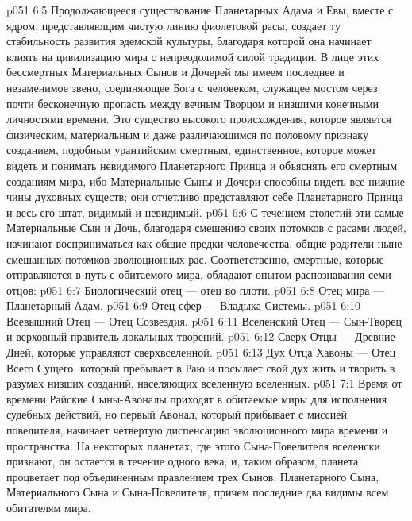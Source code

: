 \vs p051 6:5 \pc Продолжающееся существование Планетарных Адама и Евы, вместе с ядром, представляющим чистую линию фиолетовой расы, создает ту стабильность развития эдемской культуры, благодаря которой она начинает влиять на цивилизацию мира с непреодолимой силой традиции. В лице этих бессмертных Материальных Сынов и Дочерей мы имеем последнее и незаменимое звено, соединяющее Бога с человеком, служащее мостом через почти бесконечную пропасть между вечным Творцом и низшими конечными личностями времени. Это существо высокого происхождения, которое является физическим, материальным и даже различающимся по половому признаку созданием, подобным урантийским смертным, единственное, которое может видеть и понимать невидимого Планетарного Принца и объяснять его смертным созданиям мира, ибо Материальные Сыны и Дочери способны видеть все нижние чины духовных существ; они отчетливо представляют себе Планетарного Принца и весь его штат, видимый и невидимый.
\vs p051 6:6 С течением столетий эти самые Материальные Сын и Дочь, благодаря смешению своих потомков с расами людей, начинают восприниматься как общие предки человечества, общие родители ныне смешанных потомков эволюционных рас. Соответственно, смертные, которые отправляются в путь с обитаемого мира, обладают опытом распознавания семи отцов:
\vs p051 6:7 \bibnobreakspace Биологический отец --- отец во плоти.
\vs p051 6:8 \bibnobreakspace Отец мира --- Планетарный Адам.
\vs p051 6:9 \bibnobreakspace Отец сфер --- Владыка Системы.
\vs p051 6:10 \bibnobreakspace Всевышний Отец --- Отец Созвездия.
\vs p051 6:11 \bibnobreakspace Вселенский Отец --- Сын\hyp{}Творец и верховный правитель локальных творений.
\vs p051 6:12 \bibnobreakspace Сверх Отцы --- Древние Дней, которые управляют сверхвселенной.
\vs p051 6:13 \bibnobreakspace Дух Отца Хавоны --- Отец Всего Сущего, который пребывает в Раю и посылает свой дух жить и творить в разумах низших созданий, населяющих вселенную вселенных.
\vs p051 7:1 Время от времени Райские Сыны\hyp{}Авоналы приходят в обитаемые миры для исполнения судебных действий, но первый Авонал, который прибывает с миссией повелителя, начинает четвертую диспенсацию эволюционного мира времени и пространства. На некоторых планетах, где этого Сына\hyp{}Повелителя вселенски признают, он остается в течение одного века; и, таким образом, планета процветает под объединенным правлением трех Сынов: Планетарного Сына, Материального Сына и Сына\hyp{}Повелителя, причем последние два видимы всем обитателям мира.
